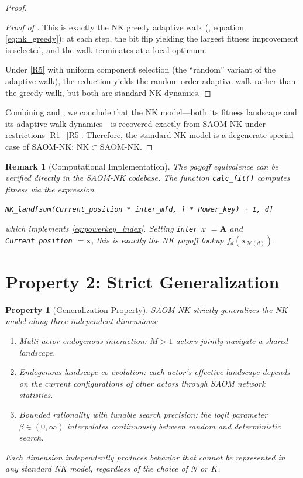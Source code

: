 \documentclass[12pt]{article}
\newtheorem{property}{Property}
\newtheorem{remark}{Remark}
\newcommand{\bx}{\mathbf{x}}
\newcommand{\bA}{\mathbf{A}}
\begin{document}
\begin{proof}
\begin{proof}[Proof of ]
This is exactly the NK greedy adaptive walk (, equation
\eqref{eq:nk_greedy}): at each step, the bit flip yielding the largest fitness
improvement is selected, and the walk terminates at a local optimum.

Under \ref{R5} with uniform component selection (the ``random'' variant of the
adaptive walk), the reduction yields the random-order adaptive walk rather than
the greedy walk, but both are standard NK dynamics.
\end{proof}

Combining  and , we conclude
that the NK model---both its fitness landscape and its adaptive walk
dynamics---is recovered exactly from SAOM-NK under restrictions
\ref{R1}--\ref{R5}. Therefore, the standard NK model is a degenerate special
case of SAOM-NK: $\mathrm{NK} \subset \text{SAOM-NK}$. \qedhere
\end{proof}

\begin{remark}[Computational Implementation]
\label{rem:implementation}
The payoff equivalence can be verified directly in the SAOM-NK codebase.
The function \texttt{calc\_fit()} computes fitness via the expression
\begin{center}
\texttt{NK\_land[sum(Current\_position * inter\_m[d, ] * Power\_key) + 1, d]}
\end{center}
which implements \eqref{eq:powerkey_index}. Setting \texttt{inter\_m} $= \bA$
and \texttt{Current\_position} $= \bx$, this is exactly the NK payoff lookup
$f_d(\bx_{\mathcal{N}(d)})$.
\end{remark}

\section{Property 2: Strict Generalization}
\label{sec:generalization}

\begin{property}[Generalization Property]
\label{property:generalization}
SAOM-NK strictly generalizes the NK model along three independent dimensions:
\begin{enumerate}[label=(\alph*)]
  \item \emph{Multi-actor endogenous interaction}: $M > 1$ actors jointly
        navigate a shared landscape.
  \item \emph{Endogenous landscape co-evolution}: each actor's effective
        landscape depends on the current configurations of other actors
        through SAOM network statistics.
  \item \emph{Bounded rationality with tunable search precision}: the logit
        parameter $\beta \in (0,\infty)$ interpolates continuously between
        random and deterministic search.
\end{enumerate}
Each dimension independently produces behavior that cannot be represented in
any standard NK model, regardless of the choice of $N$ or $K$.
\end{property}
\end{document}
